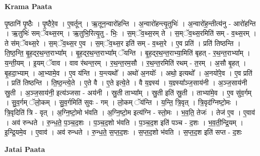 \documentclass[17pt]{extarticle}
\begin{document}
\textbf{Krama Paata} \newline

पृ॒ष्ठानि॑ पृ॒ष्ठैः । पृ॒ष्ठैरे॒व । ए॒वर्तून् । ऋ॒तून॒न्वारो॑हन्ति । अ॒न्वारो॑हन्त्यृ॒तुभिः॑ । अ॒न्वारो॑ह॒न्तीत्य॑नु - आरो॑हन्ति । ऋ॒तुभिः॑ सम्ॅवथ्स॒रम् । ऋ॒तुभि॒रित्यृ॒तु - भिः॒ । स॒म्ॅव॒थ्स॒रम् ते । स॒म्ॅव॒थ्स॒रमिति॑ सम् - व॒थ्स॒रम् । ते स॑म्ॅवथ्स॒रे । स॒म्ॅव॒थ्स॒र ए॒व । स॒म्ॅव॒थ्स॒र इति॑ सम् - व॒थ्स॒रे । ए॒व प्रति॑ । प्रति॑ तिष्ठन्ति । ति॒ष्ठ॒न्ति॒ बृ॒ह॒द्‍र॒थ॒न्त॒राभ्या᳚म् । बृ॒ह॒द्‍र॒थ॒न्त॒राभ्या᳚म् ॅयन्ति । बृ॒ह॒द्‍र॒थ॒न्त॒राभ्या॒मिति॑ बृहत् - र॒थ॒न्त॒राभ्या᳚म् । य॒न्ती॒यम् । इ॒यम् ॅवाव । वाव र॑थन्त॒रम् । र॒थ॒न्त॒रम॒सौ । र॒थ॒न्त॒रमिति॑ रथम् - त॒रम् । अ॒सौ बृ॒हत् । बृ॒हदा॒भ्याम् । आ॒भ्यामे॒व । ए॒व य॑न्ति । य॒न्त्यथो᳚ । अथो॑ अ॒नयोः᳚ । अथो॒ इत्यथो᳚ । अ॒नयो॑रे॒व । ए॒व प्रति॑ । प्रति॑ तिष्ठन्ति । ति॒ष्ठ॒न्त्ये॒ते । ए॒ते वै । ए॒ते इत्ये॒ते । वै य॒ज्ञ्स्य॑ । य॒ज्ञ्स्या᳚ञ्ज॒साय॑नी । अ॒ञ्ज॒साय॑नी स्रु॒ती । अ॒ञ्ज॒साय॑नी॒ इत्य॑ञ्जसा - अय॑नी । स्रु॒ती ताभ्या᳚म् । स्रु॒ती इति॑ स्रु॒ती । ताभ्या॑मे॒व । ए॒व सु॑व॒र्गम् । सु॒व॒र्गम् ॅलो॒कम् । सु॒व॒र्गमिति॑ सुवः - गम् । लो॒कम् ॅय॑न्ति । य॒न्ति॒ त्रि॒वृत् । त्रि॒वृद॑ग्निष्टो॒मः । त्रि॒वृदिति॑ त्रि - वृत् । अ॒ग्नि॒ष्टो॒मो भ॑वति । अ॒ग्नि॒ष्टो॒म इत्य॑ग्नि - स्तो॒मः । भ॒व॒ति॒ तेजः॑ । तेज॑ ए॒व । ए॒वाव॑ । अव॑ रुन्धते । रु॒न्ध॒ते॒ प॒ञ्च॒द॒शः । प॒ञ्च॒द॒शो भ॑वति । प॒ञ्च॒द॒श इति॑ पञ्च - द॒शः । भ॒व॒ती॒न्द्रि॒यम् । इ॒न्द्रि॒यमे॒व । ए॒वाव॑ । अव॑ रुन्धते । रु॒न्ध॒ते॒ स॒प्त॒द॒शः । स॒प्त॒द॒शो भ॑वति । स॒प्त॒द॒श इति॑ सप्त - द॒शः \newline

\textbf{Jatai Paata} \newline
\end{document}
